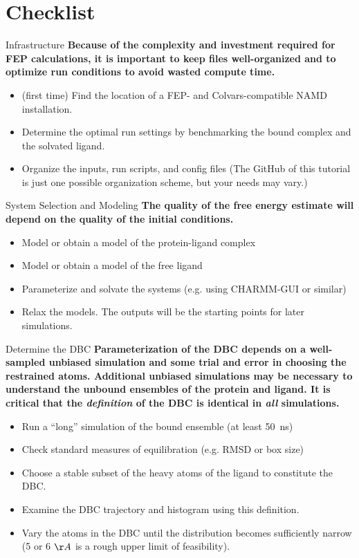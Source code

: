 \documentclass[9pt,tutorial]{Styling/livecoms}
\begin{document}
\section{Checklist}
\label{app:checklist}
\begin{Checklists*}

\begin{checklist}{Infrastructure}
\textbf{Because of the complexity and investment required for FEP calculations, it is important to keep files well-organized and to optimize run conditions to avoid wasted compute time.}
\begin{itemize}
\item (first time) Find the location of a FEP- and Colvars-compatible NAMD installation.
\item Determine the optimal run settings by benchmarking the bound complex and the solvated ligand.
\item Organize the inputs, run scripts, and config files (The GitHub of this tutorial is just one possible organization scheme, but your needs may vary.)
\end{itemize}
\end{checklist}

\begin{checklist}{System Selection and Modeling}
\textbf{The quality of the free energy estimate will depend on the quality of the initial conditions.}
\begin{itemize}
\item Model or obtain a model of the protein-ligand complex
\item Model or obtain a model of the free ligand
\item Parameterize and solvate the systems (e.g. using CHARMM-GUI or similar)
\item Relax the models. The outputs will be the starting points for later simulations.
\end{itemize}
\end{checklist}

\begin{checklist}{Determine the DBC}
\textbf{Parameterization of the DBC depends on a well-sampled unbiased simulation and some trial and error in choosing the restrained atoms. Additional unbiased simulations may be necessary to understand the unbound ensembles of the protein and ligand. It is critical that the \textit{definition }of the DBC is identical in \textit{all} simulations.}
\begin{itemize}
\item Run a ``long'' simulation of the bound ensemble (at least 50~ns)
\item Check standard measures of equilibration (e.g. RMSD or box size)
\item Choose a stable subset of the heavy atoms of the ligand to constitute the DBC.
\item Examine the DBC trajectory and histogram using this definition.
\item Vary the atoms in the DBC until the distribution becomes sufficiently narrow (5 or 6 $\AA$ is a rough upper limit of feasibility).
\end{itemize}
\end{checklist}


\end{Checklists*}
\end{document}
